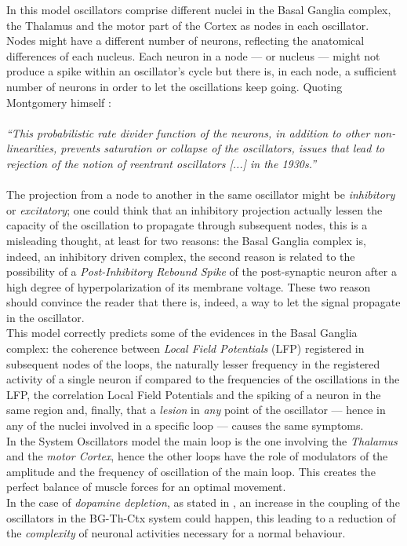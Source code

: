 \documentclass[MSc,english]{Container/thesistemplate}
\begin{document}
In this model oscillators comprise different nuclei in the Basal Ganglia complex, the Thalamus and the motor part of the Cortex as nodes in each oscillator. Nodes might have a different number of neurons, reflecting the anatomical differences of each nucleus. Each neuron in a node --- or nucleus --- might not produce a spike within an oscillator's cycle but there is, in each node, a sufficient number of neurons in order to let the oscillations keep going. Quoting Montgomery himself \cite{montgomery}: 
\\
\\\emph{``This probabilistic rate divider function of the neurons, in addition to other non-linearities, prevents saturation or collapse of the oscillators, issues that lead to rejection of the notion of reentrant oscillators [...] in the 1930s.''}
\\
\\The projection from a node to another in the same oscillator might be \emph{inhibitory} or \emph{excitatory}; one could think that an inhibitory projection actually lessen the capacity of the oscillation to propagate through subsequent nodes, this is a misleading thought, at least for two reasons: the Basal Ganglia complex is, indeed, an inhibitory driven complex, the second reason is related to the possibility of a \emph{Post-Inhibitory Rebound Spike} of the post-synaptic neuron after a high degree of hyperpolarization of its membrane voltage. These two reason should convince the reader that there is, indeed, a way to let the signal propagate in the oscillator.
\\This model correctly predicts some of the evidences in the Basal Ganglia complex: the coherence between \emph{Local Field Potentials} (LFP) registered in subsequent nodes of the loops, the naturally lesser frequency in the registered activity of a single neuron if compared to the frequencies of the oscillations in the LFP, the correlation Local Field Potentials and the spiking of a neuron in the same region and, finally, that a \emph{lesion} in \emph{any} point of the oscillator --- hence in any of the nuclei involved in a specific loop --- causes the same symptoms.
\\In the System Oscillators model the main loop is the one involving the \emph{Thalamus} and the \emph{motor Cortex}, hence the other loops have the role of modulators of the amplitude and the frequency of oscillation of the main loop. This creates the perfect balance of muscle forces for an optimal movement.
\\In the case of \emph{dopamine depletion}, as stated in \cite{montgomery}, an increase in the coupling of the oscillators in the BG-Th-Ctx system could happen, this leading to a reduction of the \emph{complexity} of neuronal activities necessary for a normal behaviour.
\end{document}
